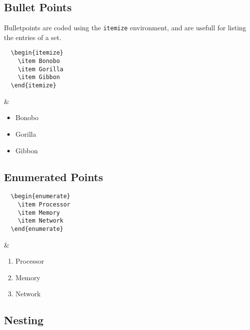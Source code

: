 \subsection{Bullet Points}

Bulletpoints are coded using the \texttt{itemize} environment, and are usefull for listing the entries of a set.

\begin{latexdemo}
  \begin{verbatim}
  \begin{itemize}
    \item Bonobo
    \item Gorilla
    \item Gibbon
  \end{itemize}
  \end{verbatim}
  &
  \begin{itemize}
    \item Bonobo
    \item Gorilla
    \item Gibbon
  \end{itemize}
\end{latexdemo}

\subsection{Enumerated Points}

\begin{latexdemo}
  \begin{verbatim}
  \begin{enumerate}
    \item Processor
    \item Memory
    \item Network
  \end{enumerate}
  \end{verbatim}
  &
  \begin{enumerate}
    \item Processor
    \item Memory
    \item Network
  \end{enumerate}
\end{latexdemo}

\subsection{Nesting}

